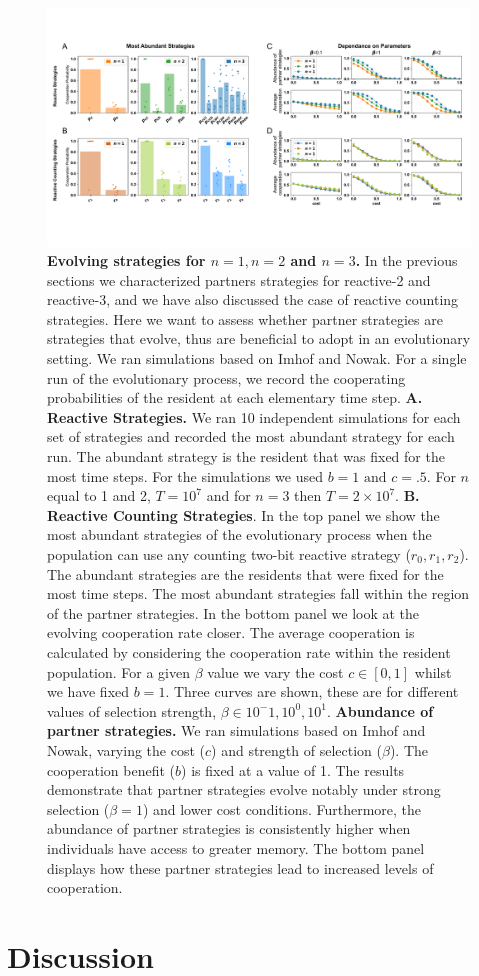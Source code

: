 \documentclass{article}
\theoremstyle{definition}
\begin{document}
\begin{figure}[htbp]
  \centering
  \includegraphics[width=\textwidth]{figures/evolutionary_results.pdf}
  \caption{\textbf{Evolving strategies for $n=1, n=2$ and $n=3$.} In the previous sections we
  characterized partners strategies for reactive-2 and reactive-3, and we
  have also discussed the case of reactive counting strategies. Here we want to
  assess whether partner strategies are strategies that evolve, thus are beneficial to
  adopt in an evolutionary setting. We ran simulations based on Imhof and Nowak.
  For a single run of the evolutionary process, we record the cooperating
  probabilities of the resident at each elementary time step.
  \textbf{A. Reactive Strategies.} We ran 10 independent simulations for each
  set of strategies and recorded the most abundant strategy for each run. The
  abundant strategy is the resident that was fixed for the most time steps. For
  the simulations we used \(b=1 \text{ and } c=.5\). For $n$ equal to 1 and
  2, \(T= 10 ^ 7\) and for $n=3$ then \(T= 2 \times10 ^ 7\).
  \textbf{B. Reactive Counting Strategies}. In the top panel we show the most abundant
  strategies of the evolutionary process when the population can use any
  counting two-bit reactive strategy ($r_0, r_1, r_2$). The abundant
  strategies are the residents that were fixed for the most time steps.
  The most abundant strategies fall within the region of the partner strategies.
  In the bottom panel we look at the evolving cooperation rate closer. The
  average cooperation is calculated by considering the cooperation rate within
  the resident population. For a given $\beta$ value we vary the cost $c \in [0, 1]$
  whilst we have fixed $b=1$. Three curves are shown, these are for different values
  of selection strength, $\beta \in {10^-1, 10^0, 10^1}$.
  \textbf{Abundance of partner strategies.}
  We ran simulations based on Imhof and Nowak, varying the cost ($c$) and
  strength of selection ($\beta$). The cooperation benefit ($b$) is fixed at a
  value of 1. The results demonstrate that partner strategies evolve notably
  under strong selection ($\beta=1$) and lower cost conditions. Furthermore, the abundance
  of partner strategies is consistently higher when individuals have access to
  greater memory. The bottom panel displays how these partner strategies lead to
  increased levels of cooperation.}\label{fig:evolutionary_results}
\end{figure}


\section{Discussion}

~\\

\end{document}
